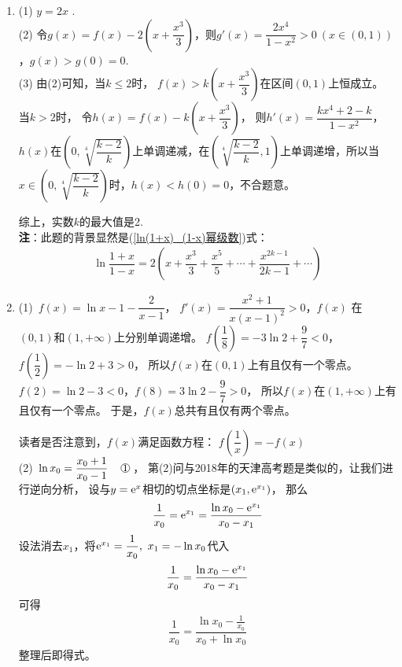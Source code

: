 \begin{enumerate}[label={\textbf{\arabic*.}},leftmargin=
    \inteval{\myenumleftmargin}pt]
必须有$ h(1)=8-K\geq 0,\ K\leq 8 $，否则，若$ K>8 $，则$ \Delta=K^2-60>0 $，
$ g(x) $在$ \left[1,\dfrac{K+\sqrt{K^2-60}}{10}\right] $上单调递减，
$ g(x)<g(1)=0 $，不合题意。当$ K=8 $时，$ h(x) $在区间
$ \left(\dfrac{4}{5},+\infty\right) $上单调递增，$ h(x)\geq h(1)=0 $，
$ g'(x)=\dfrac{h(x)}{x^2}\geq 0 $，$ g(x)\geq g(1)=0 $.

所以，$ K $的最大值是8.

\item (1) $ y=2x $ .\\
(2) 令$ g(x)=f(x)-2\left(x+\dfrac{x^{3}}{3}\right) $，则$ g'(x)=
\dfrac{2x^4}{1-x^2}>0\ (x\in(0,1)) $，$ g(x)>g(0)=0 $. \\
(3)  由(2)可知，当$ k\leq 2 $时， $ f(x)>k\left(x+
\dfrac{x^{3}}{3}\right) $在区间$ (0,1) $上恒成立。
当$ k>2 $时， 令$ h(x)=f(x)-k\left(x+\dfrac{x^{3}}{3}\right) $，
则$ h'(x)=\dfrac{k x^{4}+2-k}{1-x^{2}} $，
$ h(x) $在$ \left(0,\sqrt[4]{\dfrac{k-2}{k}}
\right) $上单调递减，在$ \left(\sqrt[4]{\dfrac{k-2}{k}},
1\right) $上单调递增，所以当 $ x\in\left(0,\sqrt[4]{\dfrac{k-2}{k}}
\right) $时，$ h(x)<h(0)=0 $，不合题意。

综上，实数$ k $的最大值是2. \\
\textbf{注}：此题的背景显然是(\ref{ln(1+x)_(1-x)幂级数})式：
\begin{align*}
    \ln\dfrac{1+x}{1-x}=2\left(x+\dfrac{x^3}{3}+\dfrac{x^5}{5}+\cdots +\dfrac{x^{2k-1}}{2k-1} +\cdots \right)
\end{align*}

\item (1)\ $ f(x)=\ln x-1-\dfrac{2}{x-1} $，
$ f'(x)=\dfrac{x^2+1}{x(x-1)^2}>0 $，$ f(x) $
在$ (0,1) $和$ (1,+\infty) $上分别单调递增。
$ f\left(\dfrac{1}{8}\right)=-3\ln 2+\dfrac{9}{7}<0 $，
$ f\left(\dfrac{1}{2}\right)=-\ln2+3>0 $，
所以$ f(x) $在$ (0,1) $上有且仅有一个零点。
$ f(2)=\ln 2-3<0 $，$ f(8)=3\ln 2-\dfrac{9}{7}>0 $，
所以$ f(x) $在$ (1,+\infty) $上有且仅有一个零点。
于是，$ f(x) $总共有且仅有两个零点。

读者是否注意到，$ f(x) $满足函数方程：
$ f\left(\dfrac{1}{x}\right)=-f(x) $ \\
(2)\ $ \ln x_0=\dfrac{x_0+1}{x_0-1}\q \mycircled{1} $，
第(2)问与2018年的天津高考题是类似的，让我们进行逆向分析，
设与$ y=\mathrm{e}^x $相切的切点坐标是$ (x_1,\mathrm{e}^{x_1}) $，
那么
\begin{gather*}
    \dfrac{1}{x_0}=\mathrm{e}^{x_1}=\dfrac{\ln x_0-\mathrm{e}^{x_1}}{x_0-x_1}
\end{gather*}
设法消去$ x_1 $，将$ \mathrm{e}^{x_1}=\dfrac{1}{x_0},\ x_1=-\ln x_0 $代入
\begin{gather*}
    \dfrac{1}{x_0}=\dfrac{\ln x_0-\mathrm{e}^{x_1}}{x_0-x_1}
\end{gather*}
可得
\begin{gather*}
    \dfrac{1}{x_0}=\dfrac{\ln x_0-\frac{1}{x_0}}{x_0+\ln x_0}
\end{gather*}
整理后即得式。


\end{enumerate}
